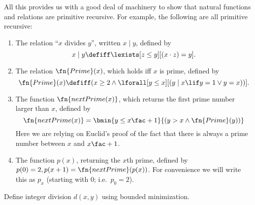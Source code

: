 \documentclass[../../include/open-logic-section]{subfiles}
\begin{document}
All this provides us with a good deal of machinery to show that
natural functions and relations are primitive recursive. For example,
the following are all primitive recursive:
\begin{enumerate}
\item The relation ``$x$ divides $y$'', written $x \mid y$, defined by
\[
x \mid y \defiff \lexists[z \leq y][(x \cdot z) = y].
\]

\item The relation $\fn{Prime}(x)$, which holds iff $x$ is prime,
  defined by
\[
\fn{Prime}(x) \defiff (x \geq 2 \land \lforall[y \leq x][(y \mid x \lif y
  = 1 \lor y = x))].
\]
\item The function $\fn{nextPrime(x)}$, which returns the first prime
  number larger than $x$, defined by
\[
  \fn{nextPrime(x)} = 
  \bmin{y \leq x\fac+1}{(y > x \land \fn{Prime}(y))}
\]
Here we are relying on Euclid's proof of the fact that there is always
a prime number between $x$ and $x\fac+1$.

\item The function $p(x)$, returning the $x$th prime, defined by $p(0)
  = 2, p(x+1) = \fn{nextPrime}(p(x))$. For convenience we will write
  this as $p_x$ (starting with 0; i.e.\ $p_0=2$).
\end{enumerate}

\begin{prob}
Define integer division $d(x, y)$ using bounded minimization.
\end{prob}
\end{document}

